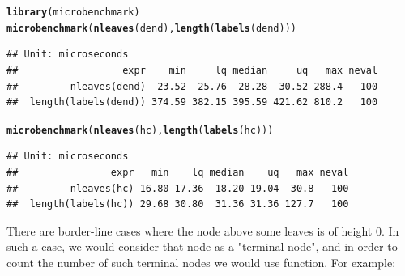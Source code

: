 \documentclass[shortnames,nojss,article]{jss}\usepackage{graphicx, color}
\makeatletter
\newcommand{\hlfunctioncall}[1]{\textcolor[rgb]{0.501960784313725,0,0.329411764705882}{\textbf{#1}}}%
\newenvironment{kframe}{%
 \def\at@end@of@kframe{}%
 \ifinner\ifhmode%
  \def\at@end@of@kframe{\end{minipage}}%
  \begin{minipage}{\columnwidth}%
 \fi\fi%
 \def\FrameCommand##1{\hskip\@totalleftmargin \hskip-\fboxsep
 \colorbox{shadecolor}{##1}\hskip-\fboxsep
     \hskip-\linewidth \hskip-\@totalleftmargin \hskip\columnwidth}%
 \MakeFramed {\advance\hsize-\width
   \@totalleftmargin\z@ \linewidth\hsize
   \@setminipage}}%
 {\par\unskip\endMakeFramed%
 \at@end@of@kframe}
\newenvironment{knitrout}{}{} %
\makeatother
\begin{document}
\begin{knitrout}
\color{fgcolor}\begin{kframe}
\begin{alltt}
\hlfunctioncall{library}(microbenchmark)
\hlfunctioncall{microbenchmark}(\hlfunctioncall{nleaves}(dend), \hlfunctioncall{length}(\hlfunctioncall{labels}(dend)))
\end{alltt}
\begin{verbatim}
## Unit: microseconds
##                  expr    min     lq median     uq   max neval
##         nleaves(dend)  23.52  25.76  28.28  30.52 288.4   100
##  length(labels(dend)) 374.59 382.15 395.59 421.62 810.2   100
\end{verbatim}
\begin{alltt}
\hlfunctioncall{microbenchmark}(\hlfunctioncall{nleaves}(hc), \hlfunctioncall{length}(\hlfunctioncall{labels}(hc)))
\end{alltt}
\begin{verbatim}
## Unit: microseconds
##                expr   min    lq median    uq   max neval
##         nleaves(hc) 16.80 17.36  18.20 19.04  30.8   100
##  length(labels(hc)) 29.68 30.80  31.36 31.36 127.7   100
\end{verbatim}
\end{kframe}
\end{knitrout}


There are border-line cases where the node above some leaves is of height 0. In such a case, we would consider that node as a "terminal node", and in order to count the number of such terminal nodes we would use  function. For example:
\end{document}
